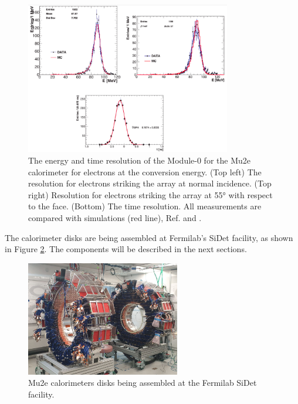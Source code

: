 \begin{figure}[!h]
    \centering
    \includegraphics[width =0.8\textwidth]{figures/png/Screenshot_20240330_105520.png}
    \caption{The energy and time resolution of the Module-0 for the Mu2e 
    calorimeter for electrons at the conversion energy. (Top left) The resolution 
    for electrons striking the array at normal incidence. (Top right) 
    Resolution for electrons striking the array at 55° with respect to the 
    face. (Bottom) The time resolution. All measurements are compared with 
    simulations (red line), Ref. \cite{bobbb} and \cite{calo95}.}
    \label{fig:calores}
\end{figure}

The calorimeter disks are being assembled at Fermilab's SiDet facility, as shown in Figure 
\ref{fig:calostatus}. The components will be described in the next sections.

\begin{figure}[!h]
    \centering
    \includegraphics[width =0.6\textwidth]{figures/png/Screenshot_20240706_151533.png}
    \caption{Mu2e calorimeters disks being assembled at the Fermilab SiDet facility.}
    \label{fig:calostatus}
\end{figure}

